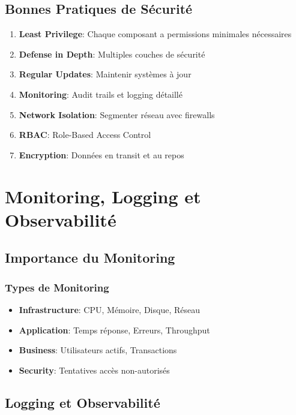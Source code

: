 \documentclass[12pt,a4paper]{report}
\begin{document}
\section{Bonnes Pratiques de Sécurité}

\begin{enumerate}
    \item \textbf{Least Privilege}: Chaque composant a permissions minimales nécessaires
    \item \textbf{Defense in Depth}: Multiples couches de sécurité
    \item \textbf{Regular Updates}: Maintenir systèmes à jour
    \item \textbf{Monitoring}: Audit trails et logging détaillé
    \item \textbf{Network Isolation}: Segmenter réseau avec firewalls
    \item \textbf{RBAC}: Role-Based Access Control
    \item \textbf{Encryption}: Données en transit et au repos
\end{enumerate}

\newpage

\chapter{Monitoring, Logging et Observabilité}

\section{Importance du Monitoring}

\subsection{Types de Monitoring}

\begin{itemize}
    \item \textbf{Infrastructure}: CPU, Mémoire, Disque, Réseau
    \item \textbf{Application}: Temps réponse, Erreurs, Throughput
    \item \textbf{Business}: Utilisateurs actifs, Transactions
    \item \textbf{Security}: Tentatives accès non-autorisés
\end{itemize}

\section{Logging et Observabilité}
\end{document}
